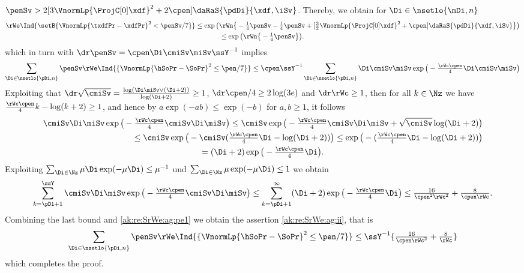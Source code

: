 \begin{pro}
  $\penSv > 2[3\VnormLp{\ProjC[0]\xdf}^2+ 2\cpen]\daRaS{\pdDi}{\xdf,\iSv}$. Thereby, we
  obtain for $\Di\in\nsetlo{\mDi,n}$
  \begin{multline*}
    \rWe\Ind{\setB{\VnormLp{\txdfPr-\xdfPr}^2<\penSv/7}}
    \leq %
    \exp\big(\rWn\big\{-\tfrac{1}{4} \penSv
    -\tfrac{1}{4}\penSv 
    +[\tfrac{3}{2}\VnormLp{\ProjC[0]\xdf}^2+\cpen]\daRaS{\pdDi}{\xdf,\iSv}\big\}\big)\\
    \leq \exp\big(\rWn\big\{-\tfrac{1}{4} \penSv\big\}\big).
  \end{multline*}
   which in turn with $\dr\penSv=\cpen \Di\cmiSv\miSv \ssY^{-1}$  implies
  \begin{equation}\label{ak:re:SrWe:ag:pe1}
    \sum_{\Di\in\nsetlo{\pDi,n}}\penSv\rWe\Ind{\{\VnormLp{\hSoPr-\SoPr}^2\leq\pen/7\}}
    \leq \cpen\ssY^{-1}\sum_{\Di\in\nsetlo{\pDi,n}} \Di\cmiSv\miSv\exp\big(-\tfrac{\rWc\cpen}{4}\Di\cmiSv\miSv\big)
  \end{equation}
  Exploiting that
  $\dr\sqrt{\cmiSv}=\tfrac{\log (\Di\miSv \vee
    (\Di+2))}{\log(\Di+2)}\geq1$, $\dr\cpen/4\geq2\log(3e)$ and
  $\dr\rWc\geq1$, then for all $k\in\Nz$ we have
  $\tfrac{\rWc\cpen}{4} k-\log(k+2)\geq1$, and hence by
  $a\exp(-ab)\leq \exp(-b)$ for $a,b\geq1$, it follows
  \begin{multline*}
    \cmiSv\Di \miSv\exp\big(-\tfrac{\rWc\cpen}{4}\cmiSv\Di\miSv\big)
    \leq\cmiSv\exp\big(-\tfrac{\rWc\cpen}{4}\cmiSv\Di\miSv + \sqrt{\cmiSv}\log(\Di+2)\big)
    \\\hfill\leq
    \cmiSv\exp\big(-\cmiSv(\tfrac{\rWc\cpen}{4}\Di-\log(\Di+2))\big)
    \leq\exp\big(-(\tfrac{\rWc\cpen}{4}\Di-\log(\Di+2))\big)\\
    =(\Di+2)\exp\big(-\tfrac{\rWc\cpen}{4}\Di\big).
  \end{multline*}
  Exploiting $\sum_{\Di\in\Nz}\mu\Di\exp(-\mu\Di)\leq \mu^{-1}$ und
  $\sum_{\Di\in\Nz}\mu\exp(-\mu\Di)\leq 1$ we obtain
  \begin{displaymath}
    \sum_{k=\pDi+1}^{\ssY}\cmiSv\Di \miSv\exp\big(-\tfrac{\rWc\cpen}{4}\cmiSv\Di\miSv\big)
    \leq \sum_{k=\pDi+1}^\infty(\Di+2)\exp\big(-\tfrac{\rWc\cpen}{4}\Di\big)
    \leq \tfrac{16}{\cpen^2\rWc^{2}}+ \tfrac{8}{\cpen\rWc}.
  \end{displaymath}
  Combining the last bound and \eqref{ak:re:SrWe:ag:pe1} we obtain the
  assertion \ref{ak:re:SrWe:ag:ii}, that is
  \begin{displaymath}
    \sum_{\Di\in\nsetlo{\pDi,n}}\penSv\rWe\Ind{\{\VnormLp{\hSoPr-\SoPr}^2\leq\pen/7\}}
    \leq \ssY^{-1}\{\tfrac{16}{\cpen\rWc^{2}}+ \tfrac{8}{\rWc}\}
  \end{displaymath}
  which completes the proof.\proEnd
\end{pro}
